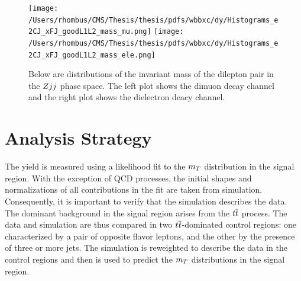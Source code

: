 \begin{figure}
      \caption[\zjj control region for the \wbb measurement]{
       Below are distributions of the invariant mass
        of the dilepton pair in the
        $Z jj$ phase space.
       The left plot shows the dimuon decay channel
        and the right plot shows the dielectron deacy channel.
      }
      \center
\texttt{[image: /Users/rhombus/CMS/Thesis/thesis/pdfs/wbbxc/dy/Histograms\_e2CJ\_xFJ\_goodL1L2\_mass\_mu.png]}
\texttt{[image: /Users/rhombus/CMS/Thesis/thesis/pdfs/wbbxc/dy/Histograms\_e2CJ\_xFJ\_goodL1L2\_mass\_ele.png]}
      \label{fig:prefit_dyjj}
\end{figure}


\section{Analysis Strategy}\label{sec:wbb_analysisstrategy}
The \wbb yield is measured using a likelihood fit 
 to the $m_T$ distribution in the signal region.
With the exception of QCD processes,
 the initial shapes and normalizations of all contributions
 in the fit are taken from simulation.
Consequently, it is important
 to verify that 
 the simulation describes the data.
The dominant background in the signal region arises 
 from the $t\overline{t}$ process.
The data and simulation
 are thus compared in two $t\overline{t}$-dominated control regions:
 one characterized by a pair of opposite flavor leptons,
 and the other by the presence of three or more jets.
The simulation is reweighted to describe the data in the control regions
 and then is used to predict the $m_T$ distributions
 in the signal region.

